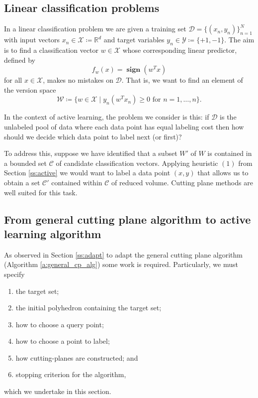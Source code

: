 \documentclass[11pt]{amsart}
\theoremstyle{definition}
\theoremstyle{remark}
\newcommand{\transpose}{T}
\DeclareMathOperator{\sign}{\textbf{sign}}
\begin{document}
    \subsection{Linear classification problems}\label{ss:classification}
        In a linear classification problem we are given a training set $\mathcal{D} = \{(x_n, y_n)\}_{n=1}^N$ with input vectors $x_n \in \mathcal{X} \coloneqq \mathbb{R}^d$ and target variables $y_n \in \mathcal{Y} \coloneqq \{+1, -1\}$. The aim is to find a classification vector $w \in \mathcal{X}$ whose corresponding linear predictor, defined by
        \begin{equation*}
            f_w(x) = \sign(w^\transpose x) 
        \end{equation*}
        for all $x \in \mathcal{X}$, makes no mistakes on $\mathcal{D}$. That is, we want to find an element of the version space
        \begin{equation*}
            \mathcal{W} \coloneqq \{ w \in \mathcal{X} \;|\; y_n (w^\transpose x_n) \geq 0 \text{ for $n = 1, \dots, n$}\}.
        \end{equation*}

        In the context of active learning, the problem we consider is this: if $\mathcal{D}$ is the unlabeled pool of data where each data point has equal labeling cost then how should we decide which data point to label next (or first)? 

        To address this, suppose we have identified that a subset $W'$ of $W$ is contained in a bounded set $\mathcal{C}$ of candidate classification vectors. Applying heuristic $(1)$ from Section \ref{ss:active} we would want to label a data point $(x, y)$ that allows us to obtain a set $\mathcal{C}'$ contained within $\mathcal{C}$ of reduced volume. Cutting plane methods are well suited for this task.
    
    \subsection{From general cutting plane algorithm to active learning algorithm}
        As observed in Section \ref{ss:adapt} to adapt the general cutting plane algorithm (Algorithm \ref{a:general_cp_alg}) some work is required. Particularly, we must specify
        \begin{enumerate}
            \item the target set;
            \item the initial polyhedron containing the target set;
            \item how to choose a query point;
            \item how to choose a point to label;
            \item how cutting-planes are constructed; and 
            \item stopping criterion for the algorithm,
        \end{enumerate}
        which we undertake in this section. 
\end{document}
